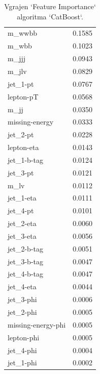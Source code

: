 \documentclass{article}
\begin{document}
\begin{table}[H]
\begin{minipage}{0.48\textwidth}
\begin{tabular}{l r}
m\_wwbb & 0.1585 \\
m\_wbb & 0.1023 \\
m\_jjj & 0.0943 \\
m\_jlv & 0.0829 \\
jet\_1-pt & 0.0767 \\
lepton-pT & 0.0568 \\
m\_jj & 0.0350 \\
missing-energy & 0.0333 \\
jet\_2-pt & 0.0228 \\
lepton-eta & 0.0143 \\
jet\_1-b-tag & 0.0124 \\
jet\_3-pt & 0.0121 \\
m\_lv & 0.0112 \\
jet\_1-eta & 0.0111 \\
jet\_4-pt & 0.0101 \\
jet\_2-eta & 0.0060 \\
jet\_3-eta & 0.0056 \\
jet\_2-b-tag & 0.0051 \\
jet\_3-b-tag & 0.0047 \\
jet\_4-b-tag & 0.0047 \\
jet\_4-eta & 0.0044 \\
jet\_3-phi & 0.0006 \\
jet\_2-phi & 0.0005 \\
missing-energy-phi & 0.0005 \\
lepton-phi & 0.0005 \\
jet\_4-phi & 0.0004 \\
jet\_1-phi & 0.0002 \\
\hline
\end{tabular}
\caption{Vgrajen `Feature Importance` algoritma `CatBoost`.}
\label{tab:cbimportance}
\end{minipage}
\end{table}
\end{document}
